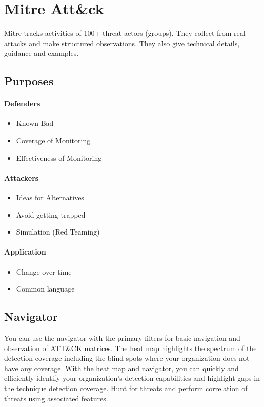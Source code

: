 \section{Mitre Att\&ck}
Mitre tracks activities of 100+ threat actors (groups).
They collect from real attacks and make structured observations.
They also give technical details, guidance and examples.

\subsection{Purposes}
\paragraph{Defenders}
\begin{itemize}
  \item Known Bad
  \item Coverage of Monitoring
  \item Effectiveness of Monitoring
\end{itemize}

\paragraph{Attackers}
\begin{itemize}
  \item Ideas for Alternatives
  \item Avoid getting trapped
  \item Simulation (Red Teaming)
\end{itemize}

\paragraph{Application}
\begin{itemize}
  \item Change over time
  \item Common language
\end{itemize}

\subsection{Navigator}
You can use the navigator with the primary filters for basic navigation and observation of ATT\&CK matrices. The heat map highlights the spectrum of the detection coverage including the blind spots where your organization does not have any coverage. With the heat map and navigator, you can quickly and efficiently identify your organization's detection capabilities and highlight gaps in the technique detection coverage. Hunt for threats and perform correlation of threats using associated features.